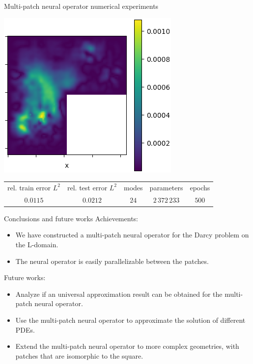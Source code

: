 \documentclass{beamer}
\begin{document}
\begin{frame}{Multi-patch neural operator numerical experiments}
\begin{center}
		\hfill
		\begin{minipage}{0.24\textwidth}
			\includegraphics[width=\textwidth]{MPNO_error.png}
		\end{minipage}
	\end{center}
	\begin{table}[h!] %
		\centering
		\begin{tabular}{ccccc}\toprule
			rel. train error $ L^2 $ & rel. test error $L^2$ & modes & parameters        & epochs \\
			\cmidrule{1-5}
			$ 0.0115 $               & $0.0212$              & $24$  & $ 2\, 372\, 233 $ & $500$  \\
			\bottomrule
		\end{tabular}
	\end{table}
\end{frame}


\begin{frame}{Conclusions and future works}
	Achievements:
	\begin{itemize}
		\item We have constructed a multi-patch neural operator for the Darcy problem on the L-domain.
		\item The neural operator is easily parallelizable between the patches.
	\end{itemize}
	\pause
	Future works:
	\begin{itemize}
		\item Analyze if an universal approximation result can be obtained for the multi-patch neural operator.
		\item Use the multi-patch neural operator to approximate the solution of different PDEs.
		\item Extend the multi-patch neural operator to more complex geometries, with patches that are isomorphic to the square.
	\end{itemize}
\end{frame}
\end{document}
